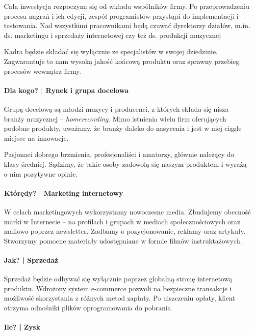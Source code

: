 \documentclass[12pt]{article}
\begin{document}
Cała inwestycja rozpoczyna się od wkładu wspólników firmy.
Po przeprowadzeniu procesu nagrań i ich edycji, zespół programistów przystąpi do implementacji i testowania.
Nad wszystkimi pracownikami będą czuwać dyrektorzy działów, m.in. ds. marketingu i sprzedaży internetowej czy też ds. produkcji muzycznej

Kadra będzie składać się wyłącznie ze specjalistów w swojej dziedzinie.
Zagwarantuje to nam wysoką jakość końcową produktu oraz sprawny przebieg procesów wewnątrz firmy.

\paragraph{Dla kogo? | Rynek i grupa docelowa}

Grupą docelową są młodzi muzycy i producenci, z których składa się nisza branży muzycznej -- \emph{homerecording}.
Mimo istnienia wielu firm oferujących podobne produkty, uważamy, że branży daleko do nasycenia i jest w niej ciągle miejsce na innowacje.

Pasjonaci dobrego brzmienia, profesjonaliści i amatorzy, głównie należący do klasy średniej.
Sądzimy, że takie osoby zadowolą się naszym produktem i wyrażą o nim pozytywne opinie.

\paragraph{Którędy? | Marketing internetowy}

W celach marketingowych wykorzystamy nowoczesne media.
Zbudujemy obecność marki w Internecie -- na profilach i grupach w mediach społecznościowych oraz mailowo poprzez newsletter.
Zadbamy o pozycjonowanie, reklamy oraz artykuły.
Stworzymy pomocne materiały udostępniane w formie filmów instruktażowych.

\paragraph{Jak? | Sprzedaż}

Sprzedaż będzie odbywać się wyłącznie poprzez globalną stronę internetową produktu.
Wdrożony system e-commerce pozwoli na bezpieczne transakcje i możliwość skorzystania z różnych metod zapłaty.
Po uiszczeniu opłaty, klient otrzyma odnośniki plików oprogramowania do pobrania.

\paragraph{Ile? | Zysk}
\end{document}

